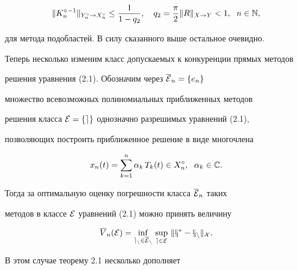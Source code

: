 $$


\|K_n^\circ {}^{-1}\|_{Y_n^\circ\rightarrow X_n^\circ}\leq


\frac{1}{1-q_2},\quad


q_2=\frac{\pi}{2}\|R\|_{X\rightarrow Y}<1,\ \;


n\in \Bbb N,


$$


для метода подобластей. В силу сказанного выше остальное очевидно.





Теперь несколько изменим класс допускаемых к конкуренции прямых методов


решения уравнения (2.1). Обозначим через $\overline{\cal E}_n=\{ e_n\}$


множество всевозможных полиномиальных приближенных методов


решения класса $\cal E=\{ e\}$ однозначно разрешимых уравнений (2.1),


позволяющих построить приближенное решение в виде многочлена


\begin{equation}


x_n(t)=\sum_{k=1}^n\alpha_k\, T_k(t)\in X_n^\circ ,\ \; \alpha_k\in \Bbb C.


\end{equation}


Тогда за оптимальную оценку погрешности класса $\overline{\cal E}_n$ таких


методов в классе $\cal E$ уравнений (2.1) можно принять величину


\begin{equation}


\overline{V}_n(\cal E)=\inf_{e_n\in \overline{\cal E}_n}\,


\sup_{e\in \cal E}\, \|x^*-x_n\|_X .


\end{equation}





В этом случае теорему 2.1 несколько дополняет





